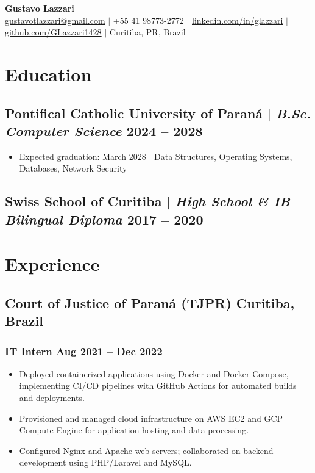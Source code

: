 \documentclass[11.5pt]{article}
\begin{document}
\begin{center}
	{\LARGE\bfseries Gustavo Lazzari} \\
	\vspace{2pt}
	\href{mailto:gustavotlazzari@gmail.com}{gustavotlazzari@gmail.com} $|$
	+55 41 98773-2772 $|$
	\href{https://www.linkedin.com/in/glazzari}{linkedin.com/in/glazzari} $|$
	\href{https://github.com/GLazzari1428}{github.com/GLazzari1428} $|$
	Curitiba, PR, Brazil
\end{center}

\section{Education}
\subsection{Pontifical Catholic University of Paran\'{a} $|$ {\normalfont\itshape B.Sc. Computer Science} \hfill 2024 -- 2028}
\begin{itemize}
	\item Expected graduation: March 2028 $|$ Data Structures, Operating Systems, Databases, Network Security
\end{itemize}
\subsection{Swiss School of Curitiba $|$ {\normalfont\itshape High School \& IB Bilingual Diploma} \hfill 2017 -- 2020}

\section{Experience}
\subsection{Court of Justice of Paran\'{a} (TJPR) \hfill Curitiba, Brazil}
\subsubsection{IT Intern \hfill Aug 2021 -- Dec 2022}
\begin{itemize}
	\item Deployed containerized applications using Docker and Docker Compose, implementing CI/CD pipelines with GitHub Actions for automated builds and deployments.
	\item Provisioned and managed cloud infrastructure on AWS EC2 and GCP Compute Engine for application hosting and data processing.
	\item Configured Nginx and Apache web servers; collaborated on backend development using PHP/Laravel and MySQL.
\end{itemize}
\end{document}
